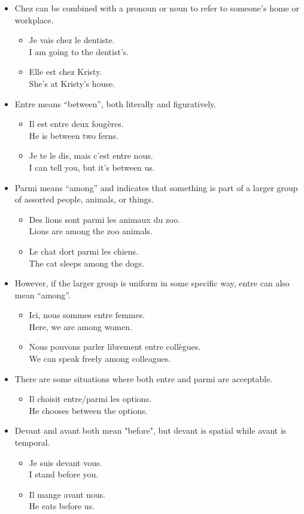 \begin{itemize}
  \item  Chez can be combined with a pronoun or noun to refer to someone's home or workplace.
    \begin{itemize}
      \item  Je vais chez le dentiste. \\ I am going to the dentist's.
      \item  Elle est chez Kristy. \\ She's at Kristy's house.
    \end{itemize}
  \item  Entre means ``between'', both literally and figuratively.
    \begin{itemize}
      \item  Il est entre deux foug{\`e}res. \\ He is between two ferns.
      \item  Je te le dis, mais c'est entre nous. \\ I can tell you, but it's between us.
    \end{itemize}
  \item  Parmi means ``among'' and indicates that something is part of a larger group of assorted people, animals, or things.
    \begin{itemize}
      \item  Des lions sont parmi les animaux du zoo. \\ Lions are among the zoo animals.
      \item  Le chat dort parmi les chiens. \\ The cat sleeps among the dogs.
    \end{itemize}
  \item  However, if the larger group is uniform in some specific way, entre can also mean ``among''.
    \begin{itemize}
      \item  Ici, nous sommes entre femmes. \\ Here, we are among women.
      \item  Nous pouvons parler librement entre coll{\`e}gues. \\ We can speak freely among colleagues.
    \end{itemize}
  \item  There are some situations where both entre and parmi are acceptable.
    \begin{itemize}
      \item  Il choisit entre/parmi les options. \\ He chooses between the options.
    \end{itemize}
  \item  Devant and avant both mean "before", but devant is spatial while avant is temporal.
    \begin{itemize}
      \item  Je suis devant vous. \\ I stand before you.
      \item  Il mange avant nous. \\ He eats before us.
    \end{itemize}
\end{itemize}

